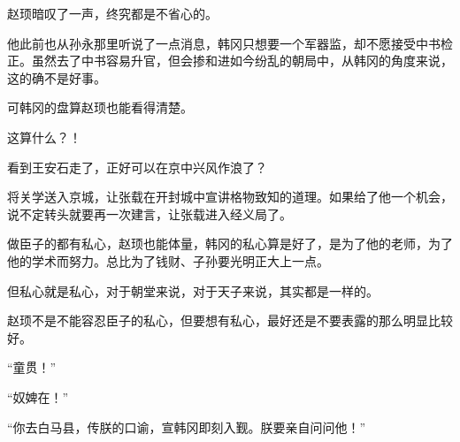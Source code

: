赵顼暗叹了一声，终究都是不省心的。

他此前也从孙永那里听说了一点消息，韩冈只想要一个军器监，却不愿接受中书检正。虽然去了中书容易升官，但会掺和进如今纷乱的朝局中，从韩冈的角度来说，这的确不是好事。

可韩冈的盘算赵顼也能看得清楚。

这算什么？！

看到王安石走了，正好可以在京中兴风作浪了？

将关学送入京城，让张载在开封城中宣讲格物致知的道理。如果给了他一个机会，说不定转头就要再一次建言，让张载进入经义局了。

做臣子的都有私心，赵顼也能体量，韩冈的私心算是好了，是为了他的老师，为了他的学术而努力。总比为了钱财、子孙要光明正大上一点。

但私心就是私心，对于朝堂来说，对于天子来说，其实都是一样的。

赵顼不是不能容忍臣子的私心，但要想有私心，最好还是不要表露的那么明显比较好。

“童贯！”

“奴婢在！”

“你去白马县，传朕的口谕，宣韩冈即刻入觐。朕要亲自问问他！”

